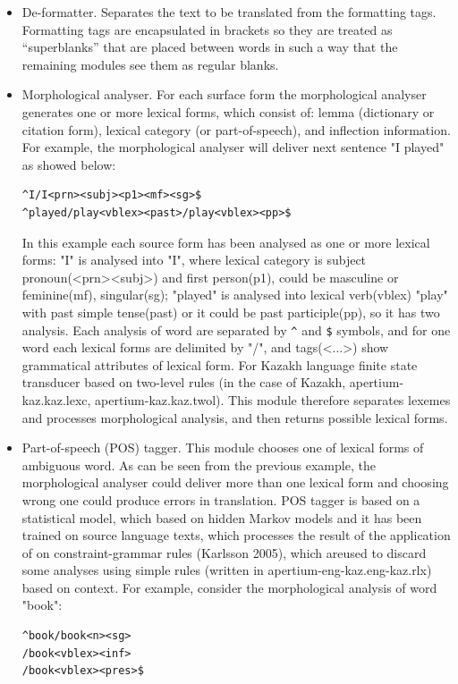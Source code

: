 \documentclass[11pt]{article}
\begin{document}
\begin{itemize}
\item 	De-formatter. Separates the text to be translated from the formatting tags.  Formatting tags are encapsulated in brackets so they are treated as “superblanks” that are placed between words in such a way that the remaining modules see them as regular blanks.  
\item	Morphological analyser. For each surface form the morphological analyser generates one or more lexical forms, which consist of: lemma (dictionary or citation form), lexical category (or part-of-speech), and inflection information. 
For example, the morphological analyser will deliver next sentence "I played" as showed below:
\begin{verbatim}
^I/I<prn><subj><p1><mf><sg>$ 
^played/play<vblex><past>/play<vblex><pp>$
\end{verbatim}
In this example each source form has been analysed as one or more lexical forms: "I" is analysed into "I", where lexical category is subject pronoun(<prn><subj>) and first person(p1), could be masculine or feminine(mf), singular(sg); "played" is analysed into lexical verb(vblex) "play" with past simple tense(past) or it could be past participle(pp), so it has two analysis. Each analysis of word are separated by \texttt{\^{}} and \texttt{\$} symbols, and for one word each lexical forms are delimited by "/", and tags(<...>) show grammatical attributes of lexical form. 
 For Kazakh language finite state transducer based on two-level rules (in the case of Kazakh, apertium-kaz.kaz.lexc, apertium-kaz.kaz.twol). This module therefore separates lexemes and processes morphological analysis, and then returns possible lexical forms.
\item	Part-of-speech (POS) tagger. This module chooses one of lexical forms of ambiguous word. As can be seen from the previous example, the morphological analyser could deliver more than one lexical form and choosing wrong one could produce errors in translation. POS tagger is based on a statistical model, which based on hidden Markov models and it has been trained on source language texts, which processes the result of the application of  on constraint-grammar rules (Karlsson 2005), which areused to discard some analyses  using simple rules (written in apertium-eng-kaz.eng-kaz.rlx) based on context. For example, consider the morphological analysis of word "book":
\begin{verbatim}
^book/book<n><sg>
/book<vblex><inf>
/book<vblex><pres>$
\end{verbatim}

\end{itemize}
\end{document}
